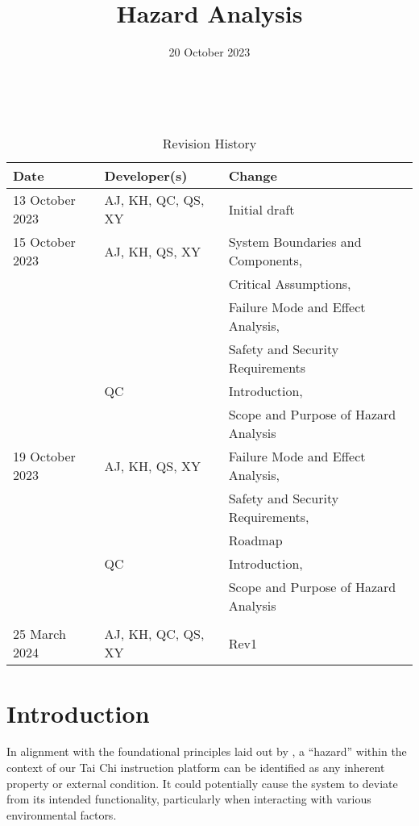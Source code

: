 \documentclass{article}
\title{Hazard Analysis\\\progname}
\author{\authname}
\date{20 October 2023}
\begin{document}
\maketitle
\thispagestyle{empty}

~\newpage


\begin{table}[hp]
  \caption{Revision History} \label{TblRevisionHistory}
  \begin{tabularx}{\textwidth}{llX}
    \toprule
    \textbf{Date} & \textbf{Developer(s)} & \textbf{Change}\\
    \midrule
    13 October 2023 & AJ, KH, QC, QS, XY & Initial draft \\
    \midrule
    15 October 2023 & AJ, KH, QS, XY & System Boundaries and Components,\\
    & & Critical Assumptions,\\
    & & Failure Mode and Effect Analysis,\\
    & & Safety and Security Requirements\\
    \midrule
    & QC & Introduction,\\
    & & Scope and Purpose of Hazard Analysis\\
    \midrule
    19 October 2023 & AJ, KH, QS, XY & Failure Mode and Effect Analysis,\\
    & & Safety and Security Requirements,\\
    & & Roadmap\\
    \midrule
    & QC & Introduction,\\
    & & Scope and Purpose of Hazard Analysis\\
    \midrule\\
    25 March 2024 & AJ, KH, QC, QS, XY & Rev1 \\
    \bottomrule
  \end{tabularx}
\end{table}

\newpage{}

\tableofcontents{}
\listoftables{}

\newpage{}


\section{Introduction}

In alignment with the foundational principles laid out by
\textcite{leveson_engineering_2011}, a ``hazard'' within the context of our Tai
Chi instruction platform can be identified as any inherent property or external
condition. It could potentially cause the system to deviate from its intended
functionality, particularly when interacting with various environmental factors.
\end{document}
